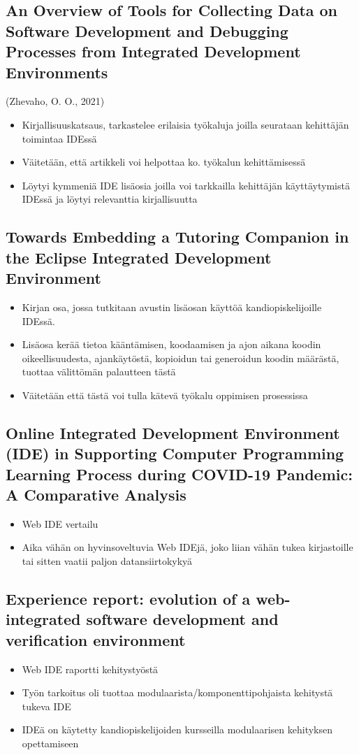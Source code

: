 \documentclass[11pt]{article}
\begin{document}
\subsection{An Overview of Tools for Collecting Data on Software Development and Debugging Processes from Integrated Development Environments}
\label{sec:org1ba6867}
(Zhevaho, O. O., 2021)
\begin{itemize}
\item Kirjallisuuskatsaus, tarkastelee erilaisia työkaluja joilla
seurataan kehittäjän toimintaa IDEssä
\item Väitetään, että artikkeli voi helpottaa ko. työkalun kehittämisessä
\item Löytyi kymmeniä IDE lisäosia joilla voi tarkkailla kehittäjän
käyttäytymistä IDEssä ja löytyi relevanttia kirjallisuutta
\end{itemize}


\subsection{Towards Embedding a Tutoring Companion in the Eclipse Integrated Development Environment}
\begin{itemize}
\item Kirjan osa, jossa tutkitaan avustin lisäosan käyttöä kandiopiskelijoille IDEssä.
\item Lisäosa kerää tietoa kääntämisen, koodaamisen ja ajon aikana koodin oikeellisuudesta, ajankäytöstä, kopioidun tai generoidun koodin määrästä, tuottaa välittömän palautteen tästä
\item Väitetään että tästä voi tulla kätevä työkalu oppimisen prosessissa
\end{itemize}


\subsection{Online Integrated Development Environment (IDE) in Supporting Computer Programming Learning Process during COVID-19 Pandemic: A Comparative Analysis}
\begin{itemize}
\item Web IDE vertailu
\item Aika vähän on hyvinsoveltuvia Web IDEjä, joko liian vähän tukea
  kirjastoille tai sitten vaatii paljon datansiirtokykyä
\end{itemize}

\subsection{Experience report: evolution of a web-integrated software development and verification environment}
\begin{itemize}
\item Web IDE raportti kehitystyöstä
\item Työn tarkoitus oli tuottaa modulaarista/komponenttipohjaista
  kehitystä tukeva IDE
\item IDEä on käytetty kandiopiskelijoiden kursseilla modulaarisen
  kehityksen opettamiseen
\end{itemize}
\end{document}
